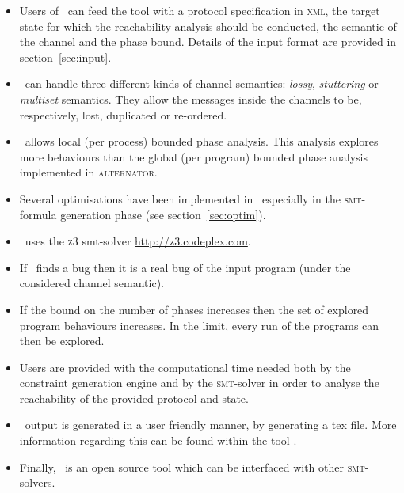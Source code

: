 \begin{itemize}
\item Users of \MPass\ can feed the tool with a protocol specification in \textsc{xml}, the target state for which the reachability analysis should be conducted, the semantic of the channel and the phase bound. Details of the input format are provided in section~\ref{sec:input}.
%
\item \MPass\ can handle three different kinds of channel semantics: {\it lossy}, {\it stuttering} or {\it multiset} semantics.
They allow the messages inside the channels to be, respectively, lost, duplicated or re-ordered.
\item \MPass\ allows local (per process) bounded phase analysis.
This analysis explores more behaviours than the global (per program) bounded phase analysis implemented in \textsc{alternator}.
%
\item Several optimisations have been implemented in \MPass\, especially in the \textsc{smt}-formula generation phase (see section~\ref{sec:optim}).
%
\item \MPass\ uses the \textsc{z3} {\sc smt}-solver \url{http://z3.codeplex.com}.
\item If \MPass\ finds a bug then it is a real bug of the input program (under the considered channel semantic).
%
\item If the bound on the number of phases increases then the set of explored program behaviours increases.
In the limit, every run of the programs can then be explored.
\item Users are provided with the computational time needed both by the constraint generation engine and by
  the \textsc{smt}-solver in order to analyse the reachability of the provided protocol and state.
%
\item \MPass\ output is generated in a user friendly manner, by generating a tex file.
More information regarding this can be found within the tool \cite{github.MPass}.
%
\item Finally, \MPass\ is an open source tool which can be interfaced with other \textsc{smt}-solvers.
\end{itemize}


